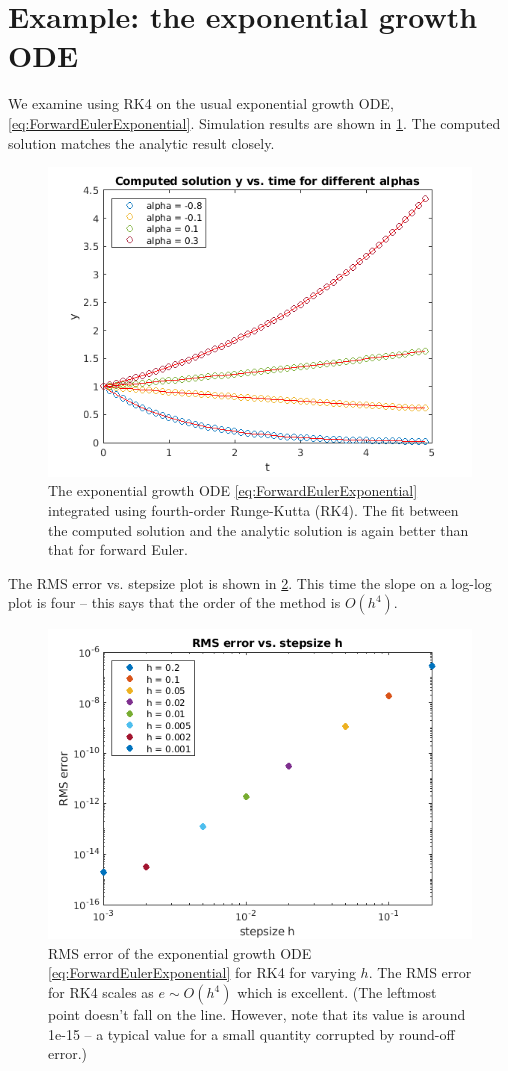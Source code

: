 \documentclass[hidelinks,notitlepage]{book}
\begin{document}
\section{Example: the exponential growth ODE}
We examine using RK4 on the usual exponential growth ODE, \cref{eq:ForwardEulerExponential}.  Simulation results are shown in \cref{fig:RK4Exponential}.  The computed solution matches the analytic result closely.
\begin{figure}[tbh]
	\centering
	\includegraphics[width=0.7\columnwidth]{RK4Exponential.png}
	\caption{The exponential growth ODE \cref{eq:ForwardEulerExponential} integrated using fourth-order Runge-Kutta (RK4).  The fit between the computed solution and the analytic solution is again better than that for forward Euler.}
	\label{fig:RK4Exponential}
\end{figure}
The RMS error vs. stepsize plot is shown in \cref{fig:RK4ExponentialErr}.  This time the slope on a log-log plot is four -- this says that the order of the method is $O(h^4)$.
\begin{figure}[tbh]
	\centering
	\includegraphics[width=0.7\columnwidth]{RK4ExponentialErr.png}
	\caption{RMS error of the exponential growth ODE \cref{eq:ForwardEulerExponential} for RK4 for varying $h$.  The RMS error for RK4 scales as $e \sim O(h^4)$ which is excellent.  (The leftmost point doesn't fall on the line.  However, note that its value is around 1e-15 -- a typical value for a small quantity corrupted by round-off error.)}
	\label{fig:RK4ExponentialErr}
\end{figure}
\end{document}
